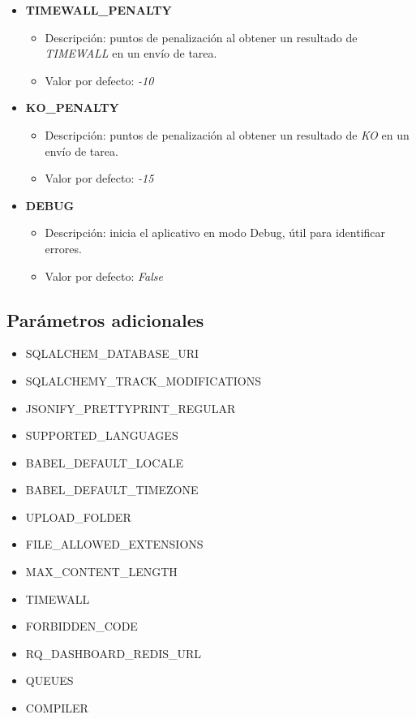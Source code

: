 \documentclass[11pt,spanish,listoffigures,listoftables]{tfgetsinf}
\begin{document}
\begin{itemize}
	\item \textbf{TIMEWALL\_PENALTY}
	\begin{itemize}
		\item Descripción: puntos de penalización al obtener un resultado de \textit{TIMEWALL} en un envío de \Gls{tarea}.
		\item Valor por defecto: \textit{-10}
	\end{itemize}
\end{itemize}

\begin{itemize}
	\item \textbf{KO\_PENALTY}
	\begin{itemize}
		\item Descripción: puntos de penalización al obtener un resultado de \textit{KO} en un envío de \Gls{tarea}.
		\item Valor por defecto: \textit{-15}
	\end{itemize}
\end{itemize}

\begin{itemize}
	\item \textbf{DEBUG}
	\begin{itemize}
		\item Descripción: inicia el aplicativo en modo Debug, útil para identificar errores.
		\item Valor por defecto: \textit{False}
	\end{itemize}
\end{itemize}

\subsection*{Parámetros adicionales}

\begin{itemize}
	\item SQLALCHEM\_DATABASE\_URI
	\item SQLALCHEMY\_TRACK\_MODIFICATIONS
	\item JSONIFY\_PRETTYPRINT\_REGULAR
	\item SUPPORTED\_LANGUAGES
	\item BABEL\_DEFAULT\_LOCALE
	\item BABEL\_DEFAULT\_TIMEZONE
	\item UPLOAD\_FOLDER
	\item FILE\_ALLOWED\_EXTENSIONS
	\item MAX\_CONTENT\_LENGTH
	\item TIMEWALL
	\item FORBIDDEN\_CODE
	\item RQ\_DASHBOARD\_REDIS\_URL
	\item QUEUES
	\item COMPILER
\end{itemize}

\glsaddall
\printglossary[title=Acrónimos,type=\acronymtype]

\glsaddall
\printglossary[title=Términos,toctitle=Terms and abbreviations]
\end{document}
